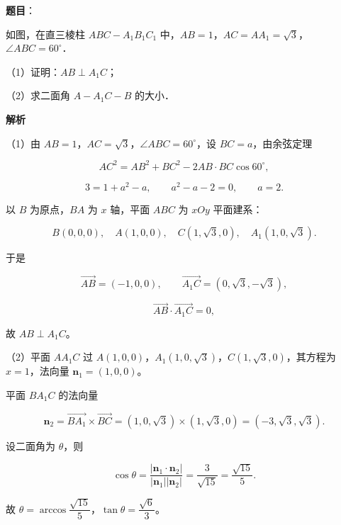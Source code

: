 \begin{answer}

\textbf{题目}：

如图，在直三棱柱 $ABC-A_1B_1C_1$ 中，$AB=1$，$AC=AA_1=\sqrt3$，$\angle ABC=60^\circ$．

（1）证明：$AB\perp A_1C$；

（2）求二面角 $A-A_1C-B$ 的大小．
\nopagebreak[4]
\begin{center}\end{center}
\nopagebreak[4]
\textbf{解析}

（1）由 $AB=1$，$AC=\sqrt3$，$\angle ABC=60^\circ$，设 $BC=a$，由余弦定理

\nopagebreak[4]
\[AC^2=AB^2+BC^2-2AB\cdot BC\cos60^\circ,\]

\nopagebreak[4]
\[3=1+a^2-a,\qquad a^2-a-2=0,\qquad a=2.\]

以 $B$ 为原点，$BA$ 为 $x$ 轴，平面 $ABC$ 为 $xOy$ 平面建系：

\nopagebreak[4]
\[B(0,0,0),\quad A(1,0,0),\quad C(1,\sqrt3,0),\quad A_1(1,0,\sqrt3).\]

于是

\nopagebreak[4]
\[\overrightarrow{AB}=(-1,0,0),\qquad \overrightarrow{A_1C}=(0,\sqrt3,-\sqrt3),\]

\nopagebreak[4]
\[\overrightarrow{AB}\cdot\overrightarrow{A_1C}=0,\]

故 $AB\perp A_1C$。

（2）平面 $AA_1C$ 过 $A(1,0,0)$，$A_1(1,0,\sqrt3)$，$C(1,\sqrt3,0)$，其方程为 $x=1$，法向量 $\boldsymbol n_1=(1,0,0)$。

平面 $BA_1C$ 的法向量

\nopagebreak[4]
\[\boldsymbol n_2=\overrightarrow{BA_1}\times\overrightarrow{BC}
=(1,0,\sqrt3)\times(1,\sqrt3,0)
=(-3,\sqrt3,\sqrt3).\]

设二面角为 $\theta$，则

\nopagebreak[4]
\[\cos\theta=\frac{|\boldsymbol n_1\cdot\boldsymbol n_2|}{|\boldsymbol n_1||\boldsymbol n_2|}
=\frac3{\sqrt{15}}=\frac{\sqrt{15}}5.\]

故 $\theta=\arccos\dfrac{\sqrt{15}}5$，$\tan\theta=\dfrac{\sqrt6}3$。


\end{answer}
